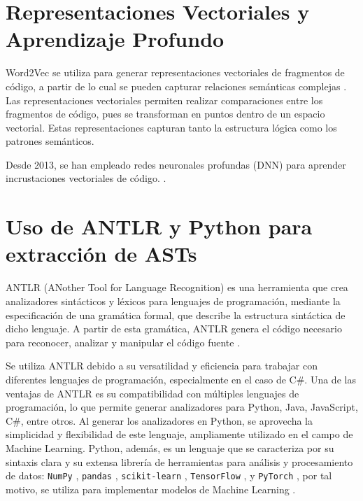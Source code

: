 \section{Representaciones Vectoriales y Aprendizaje Profundo}

Word2Vec se utiliza para generar representaciones vectoriales de fragmentos de código, a partir de lo cual se pueden capturar relaciones semánticas complejas \cite{mikolov2013efficient}. Las representaciones vectoriales permiten realizar comparaciones entre los fragmentos de código, pues se transforman en puntos dentro de un espacio vectorial. Estas representaciones capturan tanto la estructura lógica como los patrones semánticos.

Desde 2013, se han empleado redes neuronales profundas (DNN) para aprender incrustaciones vectoriales \cite{mikolov2013efficient} de código. \cite{he2015deep}.

\section{Uso de ANTLR y Python para extracción de ASTs}

ANTLR (ANother Tool for Language Recognition) \cite{antlr4} es una herramienta que crea analizadores sintácticos y léxicos para lenguajes de programación, mediante la especificación de una gramática formal, que describe la estructura sintáctica de dicho lenguaje. A partir de esta gramática, ANTLR genera el código necesario para reconocer, analizar y manipular el código fuente \cite{parr2013antlr}.

Se utiliza ANTLR debido a su versatilidad y eficiencia para trabajar con diferentes lenguajes de programación, especialmente en el caso de C\#. Una de las ventajas de ANTLR es su compatibilidad con múltiples lenguajes de programación, lo que permite generar analizadores para Python, Java, JavaScript, C\#, entre otros. Al generar los analizadores en Python, se aprovecha la simplicidad y flexibilidad de este lenguaje, ampliamente utilizado en el campo de Machine Learning. Python, además, es un lenguaje que se caracteriza por su sintaxis clara y su extensa librería de herramientas para análisis y procesamiento de datos: \texttt{NumPy} \cite{harris2020array}, \texttt{pandas} \cite{mckinney2010data}, \texttt{scikit-learn} \cite{pedregosa2011scikit}, \texttt{TensorFlow} \cite{abadi2016tensorflow}, y \texttt{PyTorch} \cite{paszke2019pytorch}, por tal motivo, se utiliza para implementar modelos de Machine Learning \cite{mckinney2010data}.


